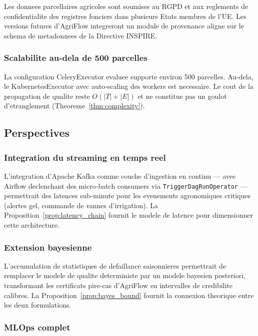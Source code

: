 \documentclass[12pt,a4paper]{article}
\theoremstyle{plain}
\theoremstyle{definition}
\theoremstyle{remark}
\begin{document}
Les donnees parcellaires agricoles sont soumises au RGPD et aux
reglements de confidentialite des registres fonciers dans plusieurs
Etats membres de l'UE. Les versions futures d'AgriFlow integreront
un module de provenance aligne sur le schema de metadonnees de la
Directive INSPIRE.

\subsubsection{Scalabilite au-dela de 500 parcelles}

La configuration CeleryExecutor evaluee supporte environ 500 parcelles.
Au-dela, le KubernetesExecutor avec auto-scaling des workers est
necessaire. Le cout de la propagation de qualite reste $O(|T|+|E|)$
et ne constitue pas un goulot d'etranglement (Theoreme~\ref{thm:complexity}).

\subsection{Perspectives}

\subsubsection{Integration du streaming en temps reel}

L'integration d'Apache Kafka comme couche d'ingestion en continu ---
avec Airflow declenchant des micro-batch consumers via
\texttt{TriggerDagRunOperator} --- permettrait des latences
sub-minute pour les evenements agronomiques critiques (alertes gel,
commande de vannes d'irrigation). La Proposition~\ref{prop:latency_chain}
fournit le modele de latence pour dimensionner cette architecture.

\subsubsection{Extension bayesienne}

L'accumulation de statistiques de defaillance saisonnieres permettrait
de remplacer le modele de qualite deterministe par un modele bayesien
posteriori, transformant les certificats pire-cas d'AgriFlow en
intervalles de credibilite calibres. La Proposition~\ref{prop:bayes_bound}
fournit la connexion theorique entre les deux formulations.

\subsubsection{MLOps complet}
\end{document}
